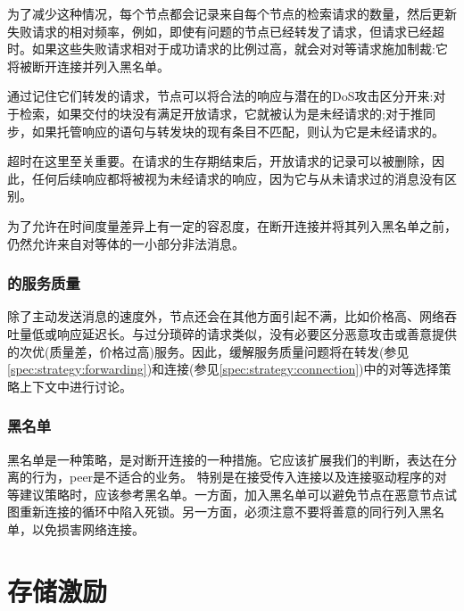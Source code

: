 为了减少这种情况，每个节点都会记录来自每个节点的检索请求的数量，然后更新失败请求的相对频率，例如，即使有问题的节点已经转发了请求，但请求已经超时。如果这些失败请求相对于成功请求的比例过高，就会对对等请求施加制裁:它将被断开连接并列入黑名单。

% 
%

通过记住它们转发的请求，节点可以将合法的响应与潜在的DoS攻击区分开来:对于检索，如果交付的块没有满足开放请求，它就被认为是未经请求的;对于推同步，如果托管响应的语句与转发块的现有条目不匹配，则认为它是未经请求的。

超时在这里至关重要。在请求的生存期结束后，开放请求的记录可以被删除，因此，任何后续响应都将被视为未经请求的响应，因为它与从未请求过的消息没有区别。 

为了允许在时间度量差异上有一定的容忍度，在断开连接并将其列入黑名单之前，仍然允许来自对等体的一小部分非法消息。

\subsubsection{的服务质量}

除了主动发送消息的速度外，节点还会在其他方面引起不满，比如价格高、网络吞吐量低或响应延迟长。与过分琐碎的请求类似，没有必要区分恶意攻击或善意提供的次优(质量差，价格过高)服务。因此，缓解服务质量问题将在转发(参见\ref{spec:strategy:forwarding})和连接(参见\ref{spec:strategy:connection})中的对等选择策略上下文中进行讨论。

\subsubsection{黑名单}

黑名单是一种策略，是对断开连接的一种措施。它应该扩展我们的判断，表达在分离的行为，peer是不适合的业务。
特别是在接受传入连接以及连接驱动程序的对等建议策略时，应该参考黑名单。一方面，加入黑名单可以避免节点在恶意节点试图重新连接的循环中陷入死锁。另一方面，必须注意不要将善意的同行列入黑名单，以免损害网络连接。



\section{存储激励\statusyellow}\label{sec:storage-incentives}


